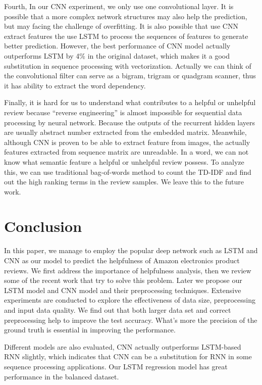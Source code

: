 \documentclass[11pt]{article}
\begin{document}
Fourth, In our CNN experiment, we only use one convolutional layer. It is possible that a more complex network structures may also help the prediction, but may facing the challenge of overfitting. It is also possible that use CNN extract features the use LSTM to process the sequences of features to generate better prediction. However, the best performance of CNN model actually outperforms LSTM by 4\% in the original dataset, which makes it a good substitution in sequence processing with vectorization. Actually we can think of the convolutional filter can serve as a bigram, trigram or quadgram scanner, thus it has ability to extract the word dependency.

Finally, it is hard for us to understand what contributes to a helpful or unhelpful review because ``reverse engineering'' is almost impossible for sequential data processing by neural network. Because the outputs of the recurrent hidden layers are usually abstract number extracted from the embedded matrix. Meanwhile, although CNN is proven to be able to extract feature from images, the actually features extracted from sequence matrix are unreadable. In a word, we can not know what semantic feature a helpful or unhelpful review possess. To analyze this, we can use traditional bag-of-words method to count the TD-IDF and find out the high ranking terms in the review samples. We leave this to the future work. 

\section{Conclusion}

In this paper, we manage to employ the popular deep network such as LSTM and CNN as our model to predict the helpfulness of Amazon electronics product reviews. We first address the importance of helpfulness analysis, then we review some of the recent work that try to solve this problem. Later we propose our LSTM model and CNN model and their preprocessing techniques. Extensive experiments are conducted to explore the effectiveness of data size, preprocessing and input data quality. We find out that both larger data set and correct preprocessing help to improve the test accuracy. What's more the precision of the ground truth is essential in improving the performance. 

Different models are also evaluated, CNN actually outperforms LSTM-based RNN slightly, which indicates that CNN can be a substitution for RNN in some sequence processing applications. Our LSTM regression model has great performance in the balanced dataset. 
\end{document}
